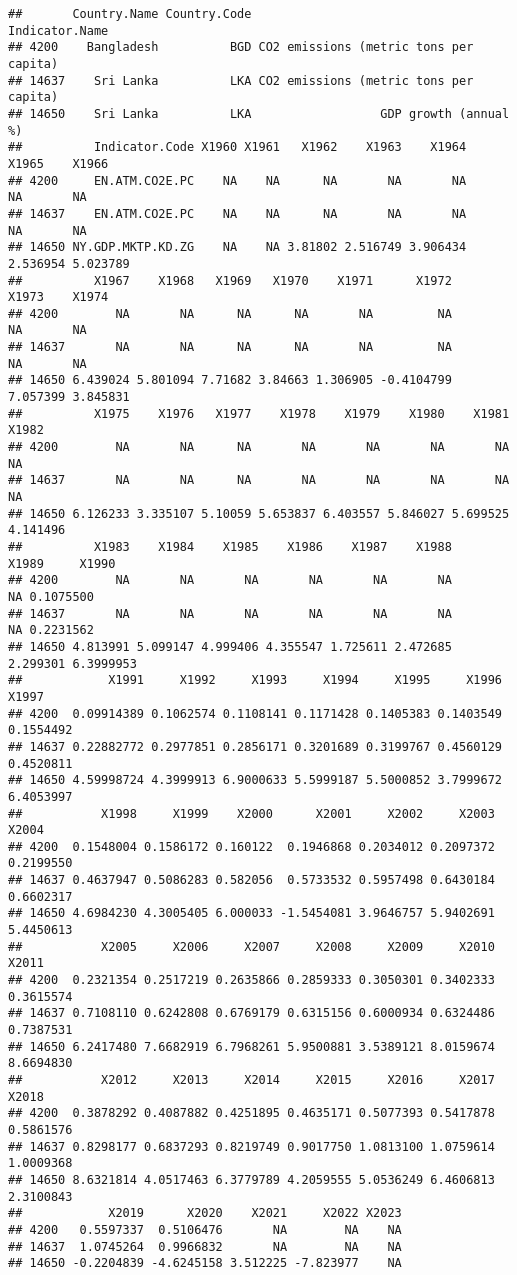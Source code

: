 \documentclass[
]{article}
\begin{document}
\begin{verbatim}
##       Country.Name Country.Code                         Indicator.Name
## 4200    Bangladesh          BGD CO2 emissions (metric tons per capita)
## 14637    Sri Lanka          LKA CO2 emissions (metric tons per capita)
## 14650    Sri Lanka          LKA                  GDP growth (annual %)
##          Indicator.Code X1960 X1961   X1962    X1963    X1964    X1965    X1966
## 4200     EN.ATM.CO2E.PC    NA    NA      NA       NA       NA       NA       NA
## 14637    EN.ATM.CO2E.PC    NA    NA      NA       NA       NA       NA       NA
## 14650 NY.GDP.MKTP.KD.ZG    NA    NA 3.81802 2.516749 3.906434 2.536954 5.023789
##          X1967    X1968   X1969   X1970    X1971      X1972    X1973    X1974
## 4200        NA       NA      NA      NA       NA         NA       NA       NA
## 14637       NA       NA      NA      NA       NA         NA       NA       NA
## 14650 6.439024 5.801094 7.71682 3.84663 1.306905 -0.4104799 7.057399 3.845831
##          X1975    X1976   X1977    X1978    X1979    X1980    X1981    X1982
## 4200        NA       NA      NA       NA       NA       NA       NA       NA
## 14637       NA       NA      NA       NA       NA       NA       NA       NA
## 14650 6.126233 3.335107 5.10059 5.653837 6.403557 5.846027 5.699525 4.141496
##          X1983    X1984    X1985    X1986    X1987    X1988    X1989     X1990
## 4200        NA       NA       NA       NA       NA       NA       NA 0.1075500
## 14637       NA       NA       NA       NA       NA       NA       NA 0.2231562
## 14650 4.813991 5.099147 4.999406 4.355547 1.725611 2.472685 2.299301 6.3999953
##            X1991     X1992     X1993     X1994     X1995     X1996     X1997
## 4200  0.09914389 0.1062574 0.1108141 0.1171428 0.1405383 0.1403549 0.1554492
## 14637 0.22882772 0.2977851 0.2856171 0.3201689 0.3199767 0.4560129 0.4520811
## 14650 4.59998724 4.3999913 6.9000633 5.5999187 5.5000852 3.7999672 6.4053997
##           X1998     X1999    X2000      X2001     X2002     X2003     X2004
## 4200  0.1548004 0.1586172 0.160122  0.1946868 0.2034012 0.2097372 0.2199550
## 14637 0.4637947 0.5086283 0.582056  0.5733532 0.5957498 0.6430184 0.6602317
## 14650 4.6984230 4.3005405 6.000033 -1.5454081 3.9646757 5.9402691 5.4450613
##           X2005     X2006     X2007     X2008     X2009     X2010     X2011
## 4200  0.2321354 0.2517219 0.2635866 0.2859333 0.3050301 0.3402333 0.3615574
## 14637 0.7108110 0.6242808 0.6769179 0.6315156 0.6000934 0.6324486 0.7387531
## 14650 6.2417480 7.6682919 6.7968261 5.9500881 3.5389121 8.0159674 8.6694830
##           X2012     X2013     X2014     X2015     X2016     X2017     X2018
## 4200  0.3878292 0.4087882 0.4251895 0.4635171 0.5077393 0.5417878 0.5861576
## 14637 0.8298177 0.6837293 0.8219749 0.9017750 1.0813100 1.0759614 1.0009368
## 14650 8.6321814 4.0517463 6.3779789 4.2059555 5.0536249 6.4606813 2.3100843
##            X2019      X2020    X2021     X2022 X2023
## 4200   0.5597337  0.5106476       NA        NA    NA
## 14637  1.0745264  0.9966832       NA        NA    NA
## 14650 -0.2204839 -4.6245158 3.512225 -7.823977    NA
\end{verbatim}
\end{document}
